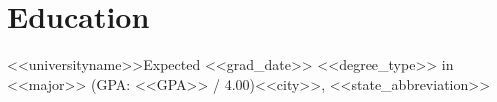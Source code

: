 \section{Education}
    \resumeSubHeadingListStart

    \resumeSubheading
    {<<universityname>>}{Expected <<grad_date>>}
    {<<degree_type>> in <<major>> (GPA: <<GPA>> / 4.00)}{<<city>>, <<state_abbreviation>>}
    \resumeItemListStart
    \resumeItemListEnd

    \resumeSubHeadingListEnd